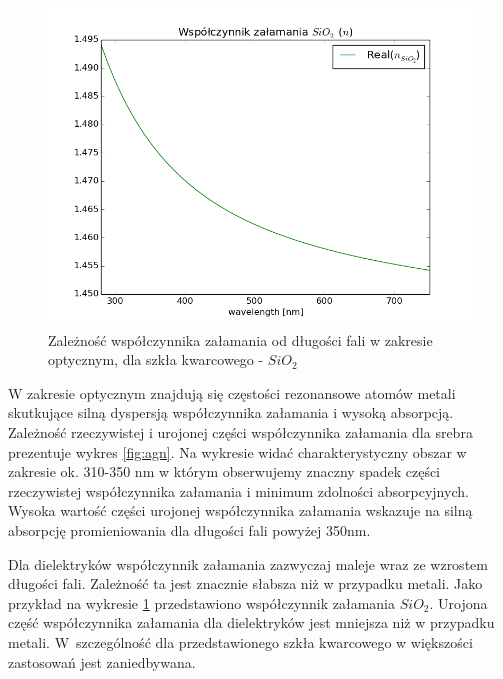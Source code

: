 \begin{figure}[tb]
	\includegraphics[width=\textwidth]{images/sio2n.png}
	\caption{Zależność współczynnika załamania od długości fali w zakresie optycznym, dla szkła kwarcowego -  $SiO_2$ \cite{MALITSON:65}   }
	\label{fig:sio2n}
\end{figure}
W zakresie optycznym znajdują się częstości rezonansowe atomów metali skutkujące silną dyspersją współczynnika załamania i wysoką absorpcją. Zależność rzeczywistej i urojonej części współczynnika załamania  dla srebra prezentuje wykres \ref{fig:agn}. Na wykresie widać charakterystyczny obszar w zakresie ok. 310-350 nm w którym obserwujemy znaczny spadek części rzeczywistej współczynnika załamania i minimum zdolności absorpcyjnych. Wysoka wartość części urojonej współczynnika załamania wskazuje na silną absorpcję promieniowania dla długości fali powyżej 350nm.

Dla dielektryków współczynnik załamania zazwyczaj maleje wraz ze wzrostem długości fali. Zależność ta jest znacznie słabsza niż w przypadku metali. Jako przykład na wykresie \ref{fig:sio2n} przedstawiono współczynnik załamania $SiO_2$. Urojona część współczynnika załamania dla dielektryków jest mniejsza niż w przypadku metali. W~szczególność dla przedstawionego szkła kwarcowego w większości zastosowań jest zaniedbywana.

